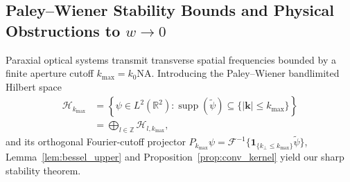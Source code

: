 \documentclass[aps,pra,reprint,nofootinbib,floatfix,longbibliography]{revtex4-2}
\theoremstyle{remark}
\newcommand{\abs}[1]{\lvert #1 \rvert}
\begin{document}
\subsection{Paley--Wiener Stability Bounds and Physical Obstructions to \texorpdfstring{$w \to 0$}{w -> 0}}
\label{subsec:paley_wiener}

Paraxial optical systems transmit transverse spatial frequencies bounded by a finite aperture cutoff $k_{\max} = k_0 \mathrm{NA}$. Introducing the Paley--Wiener bandlimited Hilbert space
\begin{align}
\mathcal{H}_{k_{\max}} &= \left\{\psi \in L^2(\mathbb{R}^2) : \operatorname{supp}(\widetilde{\psi}) \subseteq \{\abs{\mathbf{k}} \le k_{\max}\}\right\} \nonumber \\
&= \bigoplus_{l\in\mathbb{Z}} \mathcal{H}_{l,k_{\max}},
\label{eq:paley_wiener}
\end{align}
and its orthogonal Fourier-cutoff projector $P_{k_{\max}}\psi = \mathcal{F}^{-1}\{\mathbf{1}_{\{k_\perp \le k_{\max}\}}\widetilde{\psi}\}$, Lemma~\ref{lem:bessel_upper} and Proposition~\ref{prop:conv_kernel} yield our sharp stability theorem.
\end{document}
